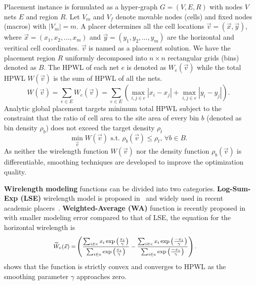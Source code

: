 \documentclass[conference,10pt]{IEEEtran}
\begin{document}
Placement instance is formulated 
as a hyper-graph $G=(V,E,R)$ with 
nodes $V$ nets $E$ and region $R$.
Let $V_m$ and $V_f$ denote 
movable nodes (cells) and 
fixed nodes (macros) with $|V_m|=m$.
A placer determines all the cell locations 
$\vec{v}=\left(\vec{x},\vec{y}\right)$, 
where $\vec{x}=(x_1,x_2,\ldots,x_m)$ and 
$\vec{y}=(y_1,y_2,\ldots,y_m)$ are the 
horizontal and veritical cell coordinates.
$\vec{v}$ is named as a placement solution.
We have the placement region $R$ uniformly 
decomposed into $n\times n$ 
rectangular grids (bins) 
denoted as $B$.
The HPWL of each net $e$ is denoted as
$W_e(\vec{v})$ while the total HPWL $W(\vec{v})$ 
is the sum of HPWL of all the nets.
{\footnotesize
\begin{equation}
\label{eq:wle}
W(\vec{v})=\sum_{e\in E}W_e(\vec{v})=\sum_{e\in E}\left(\max_{i,j\in e}|x_i-x_j|+\max_{i,j\in e}|y_i-y_j|\right).
\end{equation}}
Analytic global placement targets minimum total HPWL 
subject to the constraint that the ratio of cell area 
to the site area of every bin $b$ 
(denoted as bin density $\rho_b$) 
does not exceed 
the target density $\rho_t$
\begin{equation}
\label{eq:gp}
\min_{\vec{v}} W\left(\vec{v}\right) \text{ s.t. } \rho_b(\vec{v})\le\rho_t\text{, }\forall b\in B.
\end{equation}
As neither the wirelength function $W(\vec{v})$ 
nor the density function $\rho_b(\vec{v})$ is differentiable, 
smoothing techniques are 
developed to improve the optimization quality.

{\bf Wirelength modeling} functions 
can be divided into two categories.
{\bf Log-Sum-Exp (LSE)} 
wirelength model is proposed 
in~\cite{naylor} and widely used in recent academic 
placers~\cite{mpl6,ntupl3,aplace2}.
{\bf Weighted-Average (WA)} function is recently proposed 
in~\cite{wa} with smaller modeling error 
compared to that of LSE, the equation for the horizontal 
wirelength is 
\begin{equation}
\begin{footnotesize}
\label{eq:wa}
\begin{aligned}
\widetilde{W}_e(\vec{x}) = & \left(  \frac{\sum_{i\in e}x_i\exp\left(\frac{x_i}{\gamma}\right)}{\sum_{i\in e}\exp\left(\frac{x_i}{\gamma}\right)} - \frac{\sum_{i\in e}x_i\exp\left(\frac{-x_i}{\gamma}\right)}{\sum_{i\in e}\exp\left(\frac{-x_i}{\gamma}\right)}  \right).
\end{aligned}
\end{footnotesize}
\end{equation}
\cite{wa} shows that 
the function 
is strictly convex and
converges to HPWL as 
the smoothing parameter $\gamma$ 
approaches zero.
\end{document}

